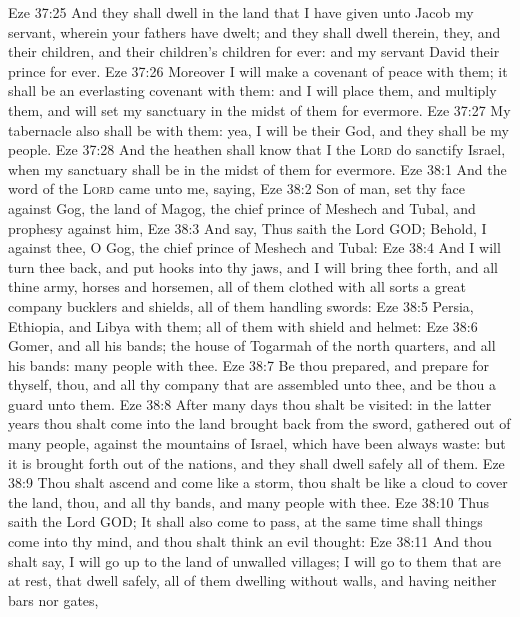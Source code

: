 \vs Eze 37:25 And they shall dwell in the land that I have given unto Jacob my servant, wherein your fathers have dwelt; and they shall dwell therein,  they, and their children, and their children's children for ever: and my servant David  their prince for ever.
\vs Eze 37:26 Moreover I will make a covenant of peace with them; it shall be an everlasting covenant with them: and I will place them, and multiply them, and will set my sanctuary in the midst of them for evermore.
\vs Eze 37:27 My tabernacle also shall be with them: yea, I will be their God, and they shall be my people.
\vs Eze 37:28 And the heathen shall know that I the \textsc{Lord} do sanctify Israel, when my sanctuary shall be in the midst of them for evermore.
\vs Eze 38:1 And the word of the \textsc{Lord} came unto me, saying,
\vs Eze 38:2 Son of man, set thy face against Gog, the land of Magog, the chief prince of Meshech and Tubal, and prophesy against him,
\vs Eze 38:3 And say, Thus saith the Lord GOD; Behold, I  against thee, O Gog, the chief prince of Meshech and Tubal:
\vs Eze 38:4 And I will turn thee back, and put hooks into thy jaws, and I will bring thee forth, and all thine army, horses and horsemen, all of them clothed with all sorts  a great company  bucklers and shields, all of them handling swords:
\vs Eze 38:5 Persia, Ethiopia, and Libya with them; all of them with shield and helmet:
\vs Eze 38:6 Gomer, and all his bands; the house of Togarmah of the north quarters, and all his bands:  many people with thee.
\vs Eze 38:7 Be thou prepared, and prepare for thyself, thou, and all thy company that are assembled unto thee, and be thou a guard unto them.
\vs Eze 38:8 After many days thou shalt be visited: in the latter years thou shalt come into the land  brought back from the sword,  gathered out of many people, against the mountains of Israel, which have been always waste: but it is brought forth out of the nations, and they shall dwell safely all of them.
\vs Eze 38:9 Thou shalt ascend and come like a storm, thou shalt be like a cloud to cover the land, thou, and all thy bands, and many people with thee.
\vs Eze 38:10 Thus saith the Lord GOD; It shall also come to pass,  at the same time shall things come into thy mind, and thou shalt think an evil thought:
\vs Eze 38:11 And thou shalt say, I will go up to the land of unwalled villages; I will go to them that are at rest, that dwell safely, all of them dwelling without walls, and having neither bars nor gates,
